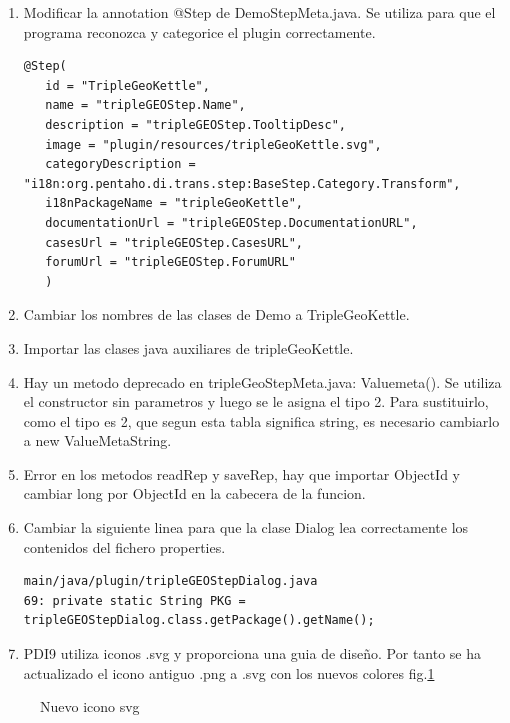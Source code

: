 \begin{enumerate}
    \item Modificar la annotation @Step de DemoStepMeta.java. Se utiliza para que el programa reconozca y
        categorice el plugin correctamente.
\begin{lstlisting}
@Step(
   id = "TripleGeoKettle",
   name = "tripleGEOStep.Name",
   description = "tripleGEOStep.TooltipDesc",
   image = "plugin/resources/tripleGeoKettle.svg",
   categoryDescription = "i18n:org.pentaho.di.trans.step:BaseStep.Category.Transform",
   i18nPackageName = "tripleGeoKettle",
   documentationUrl = "tripleGEOStep.DocumentationURL",
   casesUrl = "tripleGEOStep.CasesURL",
   forumUrl = "tripleGEOStep.ForumURL"
   )
\end{lstlisting}

    \item Cambiar los nombres de las clases de Demo a TripleGeoKettle.
    \item Importar las clases java auxiliares de tripleGeoKettle.
    \item Hay un metodo deprecado en tripleGeoStepMeta.java: Valuemeta(). Se utiliza el constructor sin
        parametros y luego se le asigna el tipo 2. Para sustituirlo, como el tipo es 2, que segun esta
        tabla\cite{tabla-string} significa string, es necesario cambiarlo a new ValueMetaString.

\item Error en los metodos readRep y saveRep, hay que importar ObjectId
 y cambiar long por ObjectId en la cabecera de la funcion.

\item Cambiar la siguiente linea para que la clase Dialog lea correctamente los contenidos del fichero properties.

\begin{lstlisting}
main/java/plugin/tripleGEOStepDialog.java
69: private static String PKG = tripleGEOStepDialog.class.getPackage().getName();
\end{lstlisting}

\item PDI9 utiliza iconos .svg y proporciona una guia de diseño\cite{guia-diseno}. Por tanto se ha actualizado el
    icono antiguo .png a .svg con los nuevos colores fig.\ref{fig:icono-TGK}
\end{enumerate}

\begin{figure}[H]
  \centering
    
    \caption{Nuevo icono svg}
    \label{fig:icono-TGK}
    \centering
\end{figure}


